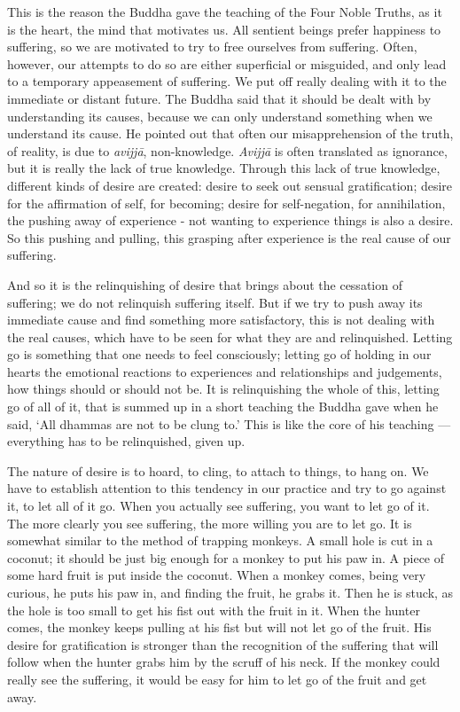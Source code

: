 This is the reason the Buddha gave the teaching of the Four Noble
Truths, as it is the heart, the mind that motivates us. All sentient
beings prefer happiness to suffering, so we are motivated to try to free
ourselves from suffering. Often, however, our attempts to do so are
either superficial or misguided, and only lead to a temporary
appeasement of suffering. We put off really dealing with it to the
immediate or distant future. The Buddha said that it should be dealt
with by understanding its causes, because we can only understand
something when we understand its cause. He pointed out that often our
misapprehension of the truth, of reality, is due to \emph{avijjā},
non-knowledge. \emph{Avijjā} is often translated as ignorance, but it is
really the lack of true knowledge. Through this lack of true knowledge,
different kinds of desire are created: desire to seek out sensual
gratification; desire for the affirmation of self, for becoming; desire
for self-negation, for annihilation, the pushing away of experience -
not wanting to experience things is also a desire. So this pushing and
pulling, this grasping after experience is the real cause of our
suffering.

And so it is the relinquishing of desire that brings about the cessation
of suffering; we do not relinquish suffering itself. But if we try to
push away its immediate cause and find something more satisfactory, this
is not dealing with the real causes, which have to be seen for what they
are and relinquished. Letting go is something that one needs to feel
consciously; letting go of holding in our hearts the emotional reactions
to experiences and relationships and judgements, how things should or
should not be. It is relinquishing the whole of this, letting go of all
of it, that is summed up in a short teaching the Buddha gave when he
said, `All dhammas are not to be clung to.' This is like the core of his
teaching --- everything has to be relinquished, given up.

The nature of desire is to hoard, to cling, to attach to things, to hang
on. We have to establish attention to this tendency in our practice and
try to go against it, to let all of it go. When you actually see
suffering, you want to let go of it. The more clearly you see suffering,
the more willing you are to let go. It is somewhat similar to the method
of trapping monkeys. A small hole is cut in a coconut; it should be just
big enough for a monkey to put his paw in. A piece of some hard fruit is
put inside the coconut. When a monkey comes, being very curious, he puts
his paw in, and finding the fruit, he grabs it. Then he is stuck, as the
hole is too small to get his fist out with the fruit in it. When the
hunter comes, the monkey keeps pulling at his fist but will not let go
of the fruit. His desire for gratification is stronger than the
recognition of the suffering that will follow when the hunter grabs him
by the scruff of his neck. If the monkey could really see the suffering,
it would be easy for him to let go of the fruit and get away.

